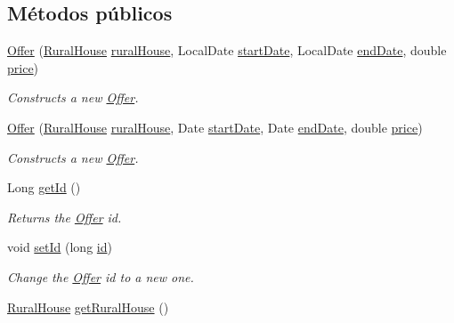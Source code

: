 \subsection*{Métodos públicos}
\begin{DoxyCompactItemize}
\item 
\mbox{\hyperlink{a00184_ac2559262a3321b69ab5abb4ae28ade81}{Offer}} (\mbox{\hyperlink{a00188}{Rural\+House}} \mbox{\hyperlink{a00184_a87036858904c59c964d2c75137a97323}{rural\+House}}, Local\+Date \mbox{\hyperlink{a00184_a3c4e8f6eb72413f6f76b1e4b05404ea8}{start\+Date}}, Local\+Date \mbox{\hyperlink{a00184_a315f9b97f02da79a97fa489db212b5ce}{end\+Date}}, double \mbox{\hyperlink{a00184_a2106c38f0c490e3263b1364c3ac56b0a}{price}})
\begin{DoxyCompactList}\small\item\em Constructs a new \mbox{\hyperlink{a00184}{Offer}}. \end{DoxyCompactList}\item 
\mbox{\hyperlink{a00184_a9e313baa59c91681f9b88a91a3254b65}{Offer}} (\mbox{\hyperlink{a00188}{Rural\+House}} \mbox{\hyperlink{a00184_a87036858904c59c964d2c75137a97323}{rural\+House}}, Date \mbox{\hyperlink{a00184_a3c4e8f6eb72413f6f76b1e4b05404ea8}{start\+Date}}, Date \mbox{\hyperlink{a00184_a315f9b97f02da79a97fa489db212b5ce}{end\+Date}}, double \mbox{\hyperlink{a00184_a2106c38f0c490e3263b1364c3ac56b0a}{price}})
\begin{DoxyCompactList}\small\item\em Constructs a new \mbox{\hyperlink{a00184}{Offer}}. \end{DoxyCompactList}\item 
Long \mbox{\hyperlink{a00184_aebea4d12647f454b017ef7102b70fd90}{get\+Id}} ()
\begin{DoxyCompactList}\small\item\em Returns the \mbox{\hyperlink{a00184}{Offer}} id. \end{DoxyCompactList}\item 
void \mbox{\hyperlink{a00184_a470323b09c0c64417eb21c748d008045}{set\+Id}} (long \mbox{\hyperlink{a00184_aba6516f5b9bb2dbe5d8b99404335adfc}{id}})
\begin{DoxyCompactList}\small\item\em Change the \mbox{\hyperlink{a00184}{Offer}} id to a new one. \end{DoxyCompactList}\item 
\mbox{\hyperlink{a00188}{Rural\+House}} \mbox{\hyperlink{a00184_a431afac3e582055bb908b715f2d22bdd}{get\+Rural\+House}} ()

\end{DoxyCompactItemize}
